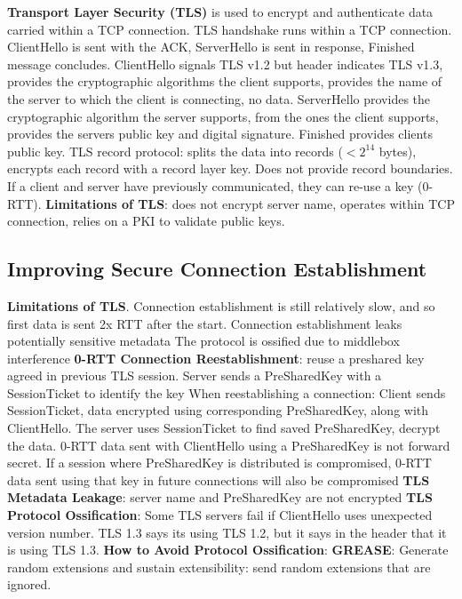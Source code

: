 \documentclass{article}
\begin{document}
\vspace{\baselineskip}
\textbf{Transport Layer Security (TLS)} is used to encrypt and authenticate data carried within a TCP connection.
TLS handshake runs within a TCP connection. ClientHello is sent with the ACK, ServerHello is sent in response, Finished message concludes.
ClientHello signals TLS v1.2 but header indicates TLS v1.3, provides the cryptographic algorithms the client supports,
provides the name of the server to which the client is connecting, no data.
ServerHello provides the cryptographic algorithm the server supports, from the ones the client supports,
provides the servers public key and digital signature.
Finished provides clients public key.
TLS record protocol: splits the data into records ($< 2^{14}$ bytes), encrypts each record with a record layer key.
Does not provide record boundaries.
If a client and server have previously communicated, they can re-use a key (0-RTT).
\textbf{Limitations of TLS}: does not encrypt server name, operates within TCP connection, relies on a PKI to validate public keys.


\clearpage

\subsection*{Improving Secure Connection Establishment}

\textbf{Limitations of TLS}.
Connection establishment is still relatively slow, and so first data is sent 2x RTT after the start.
Connection establishment leaks potentially sensitive metadata
The protocol is ossified due to middlebox interference
\textbf{0-RTT Connection Reestablishment}: reuse a preshared key agreed in previous TLS session.
Server sends a PreSharedKey with a SessionTicket to identify the key
When reestablishing a connection: Client sends SessionTicket, data encrypted using corresponding
PreSharedKey, along with ClientHello. The server uses SessionTicket to find saved PreSharedKey,
decrypt the data.
0-RTT data sent with ClientHello using a PreSharedKey is not forward secret.
If a session where PreSharedKey is distributed is compromised,
0-RTT data sent using that key in future connections will also be compromised
\textbf{TLS Metadata Leakage}: server name and PreSharedKey are not encrypted
\textbf{TLS Protocol Ossification}: Some TLS servers fail if ClientHello uses unexpected version number.
TLS 1.3 says its using TLS 1.2, but it says in the header that it is using TLS 1.3.
\textbf{How to Avoid Protocol Ossification}:
\textbf{GREASE}: Generate random extensions and sustain extensibility: send random extensions that are ignored.
\end{document}
